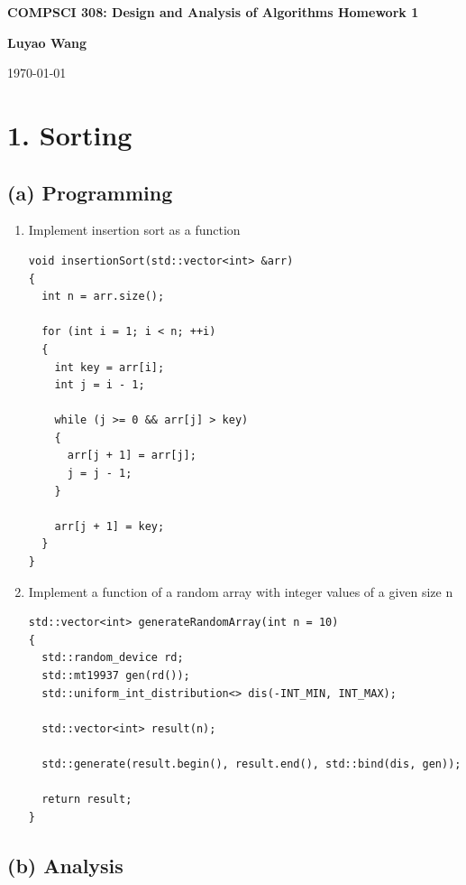 \documentclass[10pt]{article}
\begin{document}

\begin{center}
  {\Large \bf COMPSCI 308: Design and Analysis of Algorithms Homework 1}
  \vspace{2mm}

  {\bf Luyao Wang}

  {\today}
\end{center}

\section*{1. Sorting}
\subsection*{(a) Programming}

\begin{enumerate}
  \item {Implement insertion sort as a function
        \begin{verbatim}
void insertionSort(std::vector<int> &arr)
{
  int n = arr.size();

  for (int i = 1; i < n; ++i)
  {
    int key = arr[i];
    int j = i - 1;

    while (j >= 0 && arr[j] > key)
    {
      arr[j + 1] = arr[j];
      j = j - 1;
    }

    arr[j + 1] = key;
  }
}
        \end{verbatim}
        }


  \item {Implement a function of a random array with integer values of a given size n
        \begin{verbatim}
std::vector<int> generateRandomArray(int n = 10)
{
  std::random_device rd;
  std::mt19937 gen(rd());
  std::uniform_int_distribution<> dis(-INT_MIN, INT_MAX);

  std::vector<int> result(n);

  std::generate(result.begin(), result.end(), std::bind(dis, gen));

  return result;
}
        \end{verbatim}
        }
\end{enumerate}

\subsection*{(b) Analysis}
\end{document}
